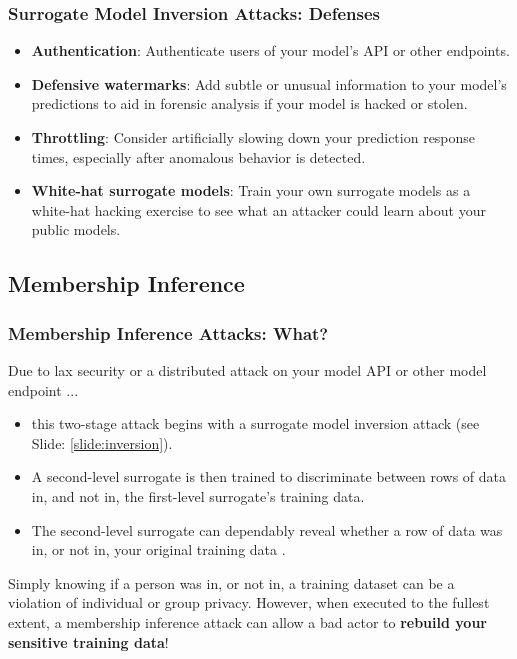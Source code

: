 \documentclass[11pt,
               aspectratio=169,
               hyperref={colorlinks}
               ]{beamer}
\begin{document}
			\begin{frame}[label={slide:inversion_defense}]
		
				\frametitle{Surrogate Model Inversion Attacks: \textbf{Defenses}}
				\begin{itemize}
					\item \textbf{Authentication}: Authenticate users of your model’s API or other endpoints.
					\item \textbf{Defensive watermarks}: Add subtle or unusual information to your model’s predictions to aid in forensic analysis if your model is hacked or stolen.
					\item \textbf{Throttling}: Consider artificially slowing down your prediction response times, especially after anomalous behavior is detected.
					\item \textbf{White-hat surrogate models}: Train your own surrogate models as a white-hat hacking exercise to see what an attacker could learn about your public models.
				\end{itemize}
				
			\end{frame}
		

		\subsection{Membership Inference}

			\begin{frame}
		
				\frametitle{Membership Inference Attacks: \textbf{What?}}		
				\small Due to lax security or a distributed attack on your model API or other model endpoint ... 
			
				\begin{itemize}
					\item this two-stage attack begins with a surrogate model inversion attack (see Slide: \ref{slide:inversion}).
					\item A second-level surrogate is then trained to discriminate between rows of data in, and not in, the first-level surrogate's training data.
					\item The second-level surrogate can dependably reveal whether a row of data was in, or not in, your original training data \cite{membership_inference}.
				\end{itemize}
				
Simply knowing if a person was in, or not in, a training dataset can be a violation of individual or group privacy. However, when executed to the fullest extent, a membership inference attack can allow a bad actor to \textbf{rebuild your sensitive training data}!\normalsize	

			\end{frame}
	
\end{document}

